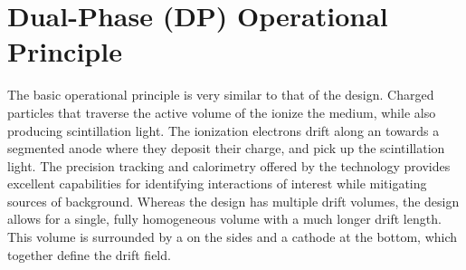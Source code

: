 
\section{Dual-Phase (DP) \lartpc Operational Principle}
\label{sec:fddp-operational-principle}


The basic operational principle is very similar to that of the \single design. 
Charged particles that traverse the active volume of the \lartpc ionize the medium, while also producing scintillation light.  The ionization electrons drift along an \efield towards a segmented anode where they deposit their charge, and  pick up the scintillation light.
The precision tracking and calorimetry offered by the \dual
technology provides excellent capabilities for identifying interactions of interest while mitigating sources of background.  
Whereas the \single design has multiple drift volumes, the  design allows for a single, fully homogeneous \lar volume with a much longer drift length. This volume is surrounded by a  on the sides and a cathode at the bottom, which together define the drift field. 


